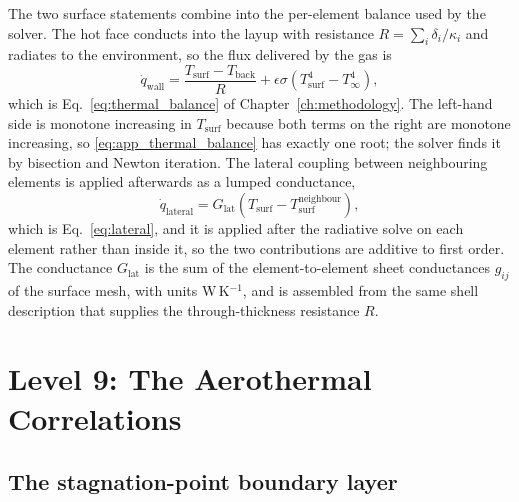 The two surface statements combine into the per-element balance used by the solver. The hot face conducts into the layup with resistance $R = \sum_i\delta_i/\kappa_i$ and radiates to the environment, so the flux delivered by the gas is
\begin{equation}
    \dot{q}_{\mathrm{wall}} = \frac{T_{\mathrm{surf}} - T_{\mathrm{back}}}{R} + \epsilon\sigma\left(T_{\mathrm{surf}}^4 - T_\infty^4\right) ,
    \label{eq:app_thermal_balance}
\end{equation}
which is Eq.~\eqref{eq:thermal_balance} of Chapter~\ref{ch:methodology}. The left-hand side is monotone increasing in $T_{\mathrm{surf}}$ because both terms on the right are monotone increasing, so \eqref{eq:app_thermal_balance} has exactly one root; the solver finds it by bisection and Newton iteration. The lateral coupling between neighbouring elements is applied afterwards as a lumped conductance,
\begin{equation}
    \dot{q}_{\mathrm{lateral}} = G_{\mathrm{lat}}\left(T_{\mathrm{surf}} - T_{\mathrm{surf}}^{\mathrm{neighbour}}\right) ,
    \label{eq:app_lateral}
\end{equation}
which is Eq.~\eqref{eq:lateral}, and it is applied after the radiative solve on each element rather than inside it, so the two contributions are additive to first order. The conductance $G_{\mathrm{lat}}$ is the sum of the element-to-element sheet conductances $g_{ij}$ of the surface mesh, with units W\,K$^{-1}$, and is assembled from the same shell description that supplies the through-thickness resistance $R$.

\section{Level 9: The Aerothermal Correlations}
\label{app:correlations}

\subsection{The stagnation-point boundary layer}

